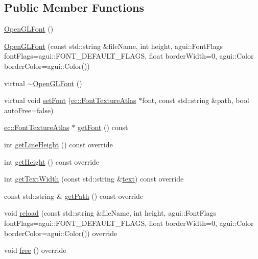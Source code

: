 \subsection*{Public Member Functions}
\begin{DoxyCompactItemize}
\item 
\mbox{\hyperlink{classec_1_1_open_g_l_font_aeacd7f309c6510b5ca6277ff3babaf3e}{Open\+G\+L\+Font}} ()
\item 
\mbox{\hyperlink{classec_1_1_open_g_l_font_a61acb43aec32afe90dae21e04e3a978e}{Open\+G\+L\+Font}} (const std\+::string \&file\+Name, int height, agui\+::\+Font\+Flags font\+Flags=agui\+::\+F\+O\+N\+T\+\_\+\+D\+E\+F\+A\+U\+L\+T\+\_\+\+F\+L\+A\+GS, float border\+Width=0, agui\+::\+Color border\+Color=agui\+::\+Color())
\item 
virtual \mbox{\hyperlink{classec_1_1_open_g_l_font_af91b03d2bdd38857733369cae6bdc193}{$\sim$\+Open\+G\+L\+Font}} ()
\item 
virtual void \mbox{\hyperlink{classec_1_1_open_g_l_font_ab01a5e5c7f4a63e3d5c2df8f0202d5d9}{set\+Font}} (\mbox{\hyperlink{classec_1_1_font_texture_atlas}{ec\+::\+Font\+Texture\+Atlas}} $\ast$font, const std\+::string \&path, bool auto\+Free=false)
\item 
\mbox{\hyperlink{classec_1_1_font_texture_atlas}{ec\+::\+Font\+Texture\+Atlas}} $\ast$ \mbox{\hyperlink{classec_1_1_open_g_l_font_a5601cf1e1b97af8217425bd7fbf7a3c3}{get\+Font}} () const
\item 
int \mbox{\hyperlink{classec_1_1_open_g_l_font_abf2f5475c622f2c722f501e13e11bc04}{get\+Line\+Height}} () const override
\item 
int \mbox{\hyperlink{classec_1_1_open_g_l_font_a1dcd36d4c95d60dbe007795ad5a1aa22}{get\+Height}} () const override
\item 
int \mbox{\hyperlink{classec_1_1_open_g_l_font_a5e3b468005c87bd3db3ed89001f56fc4}{get\+Text\+Width}} (const std\+::string \&\mbox{\hyperlink{namespaceec_a0bdee24285d69deca899e166b29c0150}{text}}) const override
\item 
const std\+::string \& \mbox{\hyperlink{classec_1_1_open_g_l_font_a9f70fb55c98b1cb2f1dcc084e3dac35c}{get\+Path}} () const override
\item 
void \mbox{\hyperlink{classec_1_1_open_g_l_font_a81003b41479e77dbfa59ab71e5891fc5}{reload}} (const std\+::string \&file\+Name, int height, agui\+::\+Font\+Flags font\+Flags=agui\+::\+F\+O\+N\+T\+\_\+\+D\+E\+F\+A\+U\+L\+T\+\_\+\+F\+L\+A\+GS, float border\+Width=0, agui\+::\+Color border\+Color=agui\+::\+Color()) override
\item 
void \mbox{\hyperlink{classec_1_1_open_g_l_font_af981f645ae669c616171097fede9c34d}{free}} () override
\end{DoxyCompactItemize}


